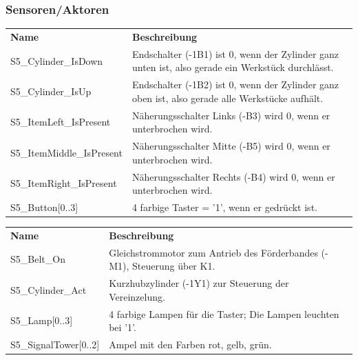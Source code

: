 \documentclass[11pt,a4paper,ngerman]{article}
\begin{document}
\subsubsection{Sensoren/Aktoren}
\begin{center}
	\setlength\extrarowheight{4pt}
	\small
	\begin{tabularx}{\textwidth}{|p{4cm}|X|}
		\hline
		\rowcolor{tublau}
		\multicolumn{2}{|c|}{\bf \color{white} \large Sensoren}\\
		\hline\hline
		\rowcolor{gray!80}
		\bf Name & \bf Beschreibung\\
		\hline\hline
		S5\_Cylinder\_IsDown & Endschalter (-1B1) ist 0, wenn der Zylinder ganz unten ist, also gerade ein Werkstück durchlässt.\\
		S5\_Cylinder\_IsUp & Endschalter (-1B2) ist 0, wenn der Zylinder ganz oben ist, also gerade alle Werkstücke aufhält.\\
		S5\_ItemLeft\_IsPresent & Näherungsschalter Links (-B3) wird 0, wenn er unterbrochen wird.\\
		S5\_ItemMiddle\_IsPresent & Näherungsschalter Mitte (-B5) wird 0, wenn er unterbrochen wird.\\
		S5\_ItemRight\_IsPresent & Näherungsschalter Rechts (-B4) wird 0, wenn er unterbrochen wird.\\
		S5\_Button[0..3] & 4 farbige Taster = '1', wenn er gedrückt ist.\\
		\hline
	\end{tabularx}
	
	\medskip
	
	\begin{tabularx}{\textwidth}{|p{4cm}|X|}
		\hline
		\rowcolor{tublau}
		\multicolumn{2}{|c|}{\bf \color{white} \large Aktoren}\\
		\hline\hline
		\rowcolor{gray!80}
		\bf Name & \bf Beschreibung\\
		\hline\hline
		S5\_Belt\_On & Gleichstrommotor zum Antrieb des Förderbandes (-M1), Steuerung über K1.\\
		S5\_Cylinder\_Act & Kurzhubzylinder (-1Y1) zur Steuerung der Vereinzelung.\\
		S5\_Lamp[0..3] & 4 farbige Lampen für die Taster; Die Lampen leuchten bei '1'.\\
		S5\_SignalTower[0..2] & Ampel mit den Farben rot, gelb, grün.\\
		\hline
	\end{tabularx}
\end{center}
\end{document}
